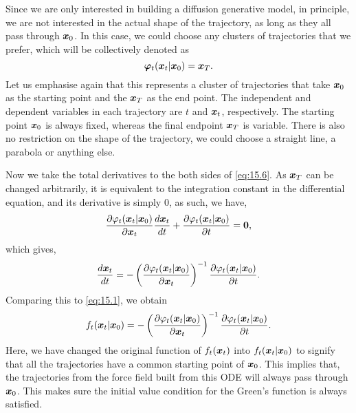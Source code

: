 Since we are only interested in building a diffusion generative model, in principle, we are not interested in the actual shape of the trajectory, as long as they all pass through $\bm{x}_0$. In this case, we could choose any clusters of trajectories that we prefer, which will be collectively denoted as 
\begin{equation}
    \label{eq:15.6}
    \bm{\varphi}_t(\bm{x}_{t}|\bm{x}_0)=\bm{x}_T.
\end{equation}
Let us emphasise again that this represents a cluster of trajectories that take $\bm{x}_0$ as the starting point and the $\bm{x}_T$ as the end point. The independent and dependent variables in each trajectory are $t$ and $\bm{x}_{t}$, respectively. The starting point $\bm{x}_0$ is always fixed, whereas the final endpoint $\bm{x}_T$ is variable. There is also no restriction on the shape of the trajectory, we could choose a straight line, a parabola or anything else.

Now we take the total derivatives to the both sides of \cref{eq:15.6}.  As $\bm{x}_T$ can be changed arbitrarily, it is equivalent to the integration constant in the differential equation, and its derivative is simply 0, as such, we have,
\begin{equation}
    \label{eq:15.7}
    \frac{\partial \varphi_t(\bm{x}_{t}|\bm{x}_0)}{\partial \bm{x}_{t}}\frac{d\bm{x}_{t}}{dt}+\frac{\partial \varphi_t(\bm{x}_{t}|\bm{x}_0)}{\partial t}=\bm{0},
\end{equation}
which gives,
\begin{equation*}
\frac{d\bm{x}_{t}}{dt}=-\left( \frac{\partial \varphi_t(\bm{x}_{t}|\bm{x}_0)}{\partial \bm{x}_{t}} \right)^{-1} \frac{\partial \varphi_t(\bm{x}_{t}|\bm{x}_0)}{\partial t}.
\end{equation*}
Comparing this to \cref{eq:15.1}, we obtain 
\begin{equation}
    \label{eq:15.8}
    f_t(\bm{x}_{t}|\bm{x}_0)=-\left( \frac{\partial \varphi_t(\bm{x}_{t}|\bm{x}_0)}{\partial \bm{x}_{t}} \right)^{-1} \frac{\partial \varphi_t(\bm{x}_{t}|\bm{x}_0)}{\partial t}.
\end{equation}
Here, we have changed the original function of $f_t(\bm{x}_{t})$ into  $f_t(\bm{x}_{t}|\bm{x}_0)$ to signify that all the trajectories have a common starting point of $\bm{x}_0$. This implies that, the trajectories from the force field built from this ODE will always pass through $\bm{x}_0$. This makes sure the initial value condition for the Green's function is always satisfied. 

